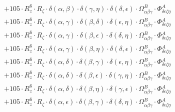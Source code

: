 \documentclass{article}
\begin{document}
\begin{equation}
\begin{array}{c}
 \\[0.2em] 		 + 105 \cdot R_{z}^{6} \cdot R_{\zeta{}} \cdot \delta{}\left(\alpha{}, \beta{}\right) \cdot \delta{}\left(\gamma{}, \eta{}\right) \cdot \delta{}\left(\delta{}, \epsilon{}\right) \cdot \Omega{}^{B}_{\alpha{}\beta{}\gamma{}} \cdot \Phi{}^{A}_{\delta{}\epsilon{}\zeta{}\eta{}} 
 \\[0.2em] 		 + 105 \cdot R_{z}^{6} \cdot R_{\zeta{}} \cdot \delta{}\left(\alpha{}, \gamma{}\right) \cdot \delta{}\left(\beta{}, \delta{}\right) \cdot \delta{}\left(\epsilon{}, \eta{}\right) \cdot \Omega{}^{B}_{\alpha{}\beta{}\gamma{}} \cdot \Phi{}^{A}_{\delta{}\epsilon{}\zeta{}\eta{}} 
 \\[0.2em] 		 + 105 \cdot R_{z}^{6} \cdot R_{\zeta{}} \cdot \delta{}\left(\alpha{}, \gamma{}\right) \cdot \delta{}\left(\beta{}, \epsilon{}\right) \cdot \delta{}\left(\delta{}, \eta{}\right) \cdot \Omega{}^{B}_{\alpha{}\beta{}\gamma{}} \cdot \Phi{}^{A}_{\delta{}\epsilon{}\zeta{}\eta{}} 
 \\[0.2em] 		 + 105 \cdot R_{z}^{6} \cdot R_{\zeta{}} \cdot \delta{}\left(\alpha{}, \gamma{}\right) \cdot \delta{}\left(\beta{}, \eta{}\right) \cdot \delta{}\left(\delta{}, \epsilon{}\right) \cdot \Omega{}^{B}_{\alpha{}\beta{}\gamma{}} \cdot \Phi{}^{A}_{\delta{}\epsilon{}\zeta{}\eta{}} 
 \\[0.2em] 		 + 105 \cdot R_{z}^{6} \cdot R_{\zeta{}} \cdot \delta{}\left(\alpha{}, \delta{}\right) \cdot \delta{}\left(\beta{}, \gamma{}\right) \cdot \delta{}\left(\epsilon{}, \eta{}\right) \cdot \Omega{}^{B}_{\alpha{}\beta{}\gamma{}} \cdot \Phi{}^{A}_{\delta{}\epsilon{}\zeta{}\eta{}} 
 \\[0.2em] 		 + 105 \cdot R_{z}^{6} \cdot R_{\zeta{}} \cdot \delta{}\left(\alpha{}, \delta{}\right) \cdot \delta{}\left(\beta{}, \epsilon{}\right) \cdot \delta{}\left(\gamma{}, \eta{}\right) \cdot \Omega{}^{B}_{\alpha{}\beta{}\gamma{}} \cdot \Phi{}^{A}_{\delta{}\epsilon{}\zeta{}\eta{}} 
 \\[0.2em] 		 + 105 \cdot R_{z}^{6} \cdot R_{\zeta{}} \cdot \delta{}\left(\alpha{}, \delta{}\right) \cdot \delta{}\left(\beta{}, \eta{}\right) \cdot \delta{}\left(\gamma{}, \epsilon{}\right) \cdot \Omega{}^{B}_{\alpha{}\beta{}\gamma{}} \cdot \Phi{}^{A}_{\delta{}\epsilon{}\zeta{}\eta{}} 
 \\[0.2em] 		 + 105 \cdot R_{z}^{6} \cdot R_{\zeta{}} \cdot \delta{}\left(\alpha{}, \epsilon{}\right) \cdot \delta{}\left(\beta{}, \gamma{}\right) \cdot \delta{}\left(\delta{}, \eta{}\right) \cdot \Omega{}^{B}_{\alpha{}\beta{}\gamma{}} \cdot \Phi{}^{A}_{\delta{}\epsilon{}\zeta{}\eta{}} 

\end{array}
\end{equation}
\end{document}
